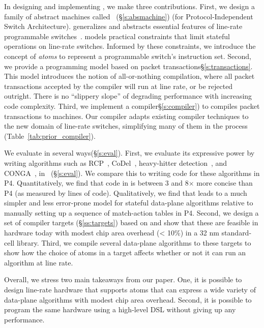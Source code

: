 In designing and implementing \pktlanguage, we make three contributions.
First, we design a family of abstract machines called
\absmachine~(\S\ref{s:absmachine}) (for Protocol-Independent Switch
Architecture). \absmachine generalizes and abstracts essential features of
line-rate programmable switches~\cite{rmt, xpliant, flexpipe}. \absmachine
models practical constraints that limit stateful operations on line-rate
switches.  Informed by these constraints, we introduce the concept of {\em
atoms} to represent a programmable switch's instruction set.  Second, we
provide a programming model based on packet transactions\S\ref{s:transactions}.
This model introduces the notion of all-or-nothing compilation, where all
packet transactions accepted by the compiler will run at line rate, or be
rejected outright. There is no ``slippery slope'' of degrading performance with
increasing code complexity.  Third, we implement a compiler\S\ref{s:compiler})
to compiles packet transactions to \absmachine machines. Our compiler adapts
existing compiler techniques to the new domain of line-rate switches,
simplifying many of them in the process (Table~\ref{tab:prior_compiler}).

We evaluate \pktlanguage in several ways(\S\ref{s:eval}). First, we evaluate
its expressive power by writing algorithms such as RCP~\cite{rcp},
CoDel~\cite{codel}, heavy-hitter detection~\cite{opensketch}, and
CONGA~\cite{conga}, in \pktlanguage~(\S\ref{s:eval}). We compare this to
writing code for these algorithms in P4. Quantitatively, we find that code in
\pktlanguage is between 3 and 8$\times$ more concise than P4 (as measured by
lines of code).  Qualitatively, we find that \pktlanguage leads to a much
simpler and less error-prone model for stateful data-plane algorithms relative
to manually setting up a sequence of match-action tables in P4.  Second, we
design a set of compiler targets (\S\ref{ss:targets}) based on \absmachine and
show that these are feasible in hardware today with modest chip area overhead
(< 10\%) in a 32 nm standard-cell library. Third, we compile several data-plane
algorithms to these targets to show how the choice of atoms in a target affects
whether or not it can run an algorithm at line rate.

Overall, we stress two main takeaways from our paper. One, it is possible to
design line-rate hardware that supports atoms that can express a wide variety
of data-plane algorithms with modest chip area overhead. Second, it is possible
to program the same hardware using a high-level DSL without giving up any
performance.
